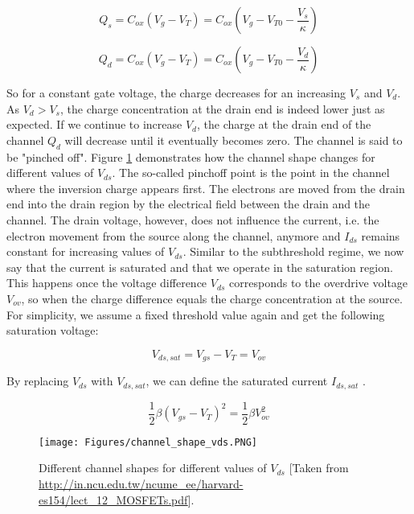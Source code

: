 \begin{equation}
    Q_s = C_{ox} (V_g - V_T) = C_{ox} (V_g - V_{T0} - \frac{V_s}{\kappa})
\end{equation}

\begin{equation}
    Q_d = C_{ox} (V_g - V_T) = C_{ox} (V_g - V_{T0} - \frac{V_d}{\kappa})
\end{equation}

So for a constant gate voltage, the charge decreases for an increasing $V_s$ and $V_d$. As $V_d > V_s$, the charge concentration at the drain end is indeed lower just as expected. If we continue to increase $V_d$, the charge at the drain end of the channel $Q_d$ will decrease until it eventually becomes zero. The channel is said to be "pinched off". Figure \ref{fig:channel_shape_vds} demonstrates how the channel shape changes for different values of $V_{ds}$. The so-called pinchoff point is the point in the channel where the inversion charge appears first. The electrons are moved from the drain end into the drain region by the electrical field between the drain and the channel. The drain voltage, however, does not influence the current, i.e. the electron movement from the source along the channel, anymore and $I_{ds}$ remains constant for increasing values of $V_{ds}$. Similar to the subthreshold regime, we now say that the current is saturated and that we operate in the saturation region. This happens once the voltage difference $V_{ds}$ corresponds to the overdrive voltage $V_{ov}$, so when the charge difference equals the charge concentration at the source. For simplicity, we assume a fixed threshold value again and get the following saturation voltage:

\begin{equation}
    V_{ds,sat} = V_{gs} - V_T = V_{ov}
\end{equation}

By replacing $V_{ds}$ with $V_{ds,sat}$, we can define the saturated current $I_{ds,sat}$ .

\begin{equation}
    \frac{1}{2} \beta (V_{gs} - V_T)^2 = \frac{1}{2} \beta V_{ov} ^2
\end{equation}

\begin{figure}
    \centering
    \texttt{[image: Figures/channel\_shape\_vds.PNG]}
    \caption{Different channel shapes for different values of $V_{ds}$ [Taken from \url{http://in.ncu.edu.tw/ncume_ee/harvard-es154/lect_12_MOSFETs.pdf}].}
    \label{fig:channel_shape_vds}
\end{figure}

